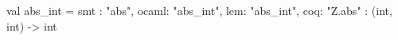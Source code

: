 val abs_int = {
  smt : "abs",
  ocaml: "abs_int",
  lem: "abs_int",
  coq: "Z.abs"
} : (int, int) -> int
